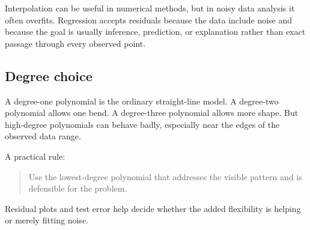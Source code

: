 Interpolation can be useful in numerical methods, but in noisy data analysis it often overfits.  Regression accepts residuals because the data include noise and because the goal is usually inference, prediction, or explanation rather than exact passage through every observed point.

\subsection*{Degree choice}

A degree-one polynomial is the ordinary straight-line model.  A degree-two polynomial allows one bend.  A degree-three polynomial allows more shape.  But high-degree polynomials can behave badly, especially near the edges of the observed data range.

A practical rule:
\begin{quote}
  Use the lowest-degree polynomial that addresses the visible pattern and is defensible for the problem.
\end{quote}

Residual plots and test error help decide whether the added flexibility is helping or merely fitting noise.

